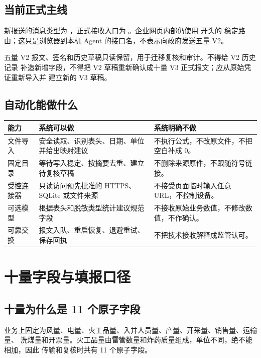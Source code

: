 \documentclass[UTF8,openany,zihao=-4,fontset=none]{ctexbook}
\begin{document}
\section{当前正式主线}

新报送的消息类型为 ，正式接收入口为
。企业网页内部仍使用  开头的
稳定路由；这只是浏览器到本机 Agent 的接口名，不表示向政府发送五量 V2。

五量 V2 报文、签名和历史草稿只读保留，用于迁移复核和审计。不得给 V2 历史记录
补造新增字段，不得把 V2 草稿重新确认成十量 V3 正式报文；应从原始凭证重新导入并
建立新的 V3 草稿。

\section{自动化能做什么}

\begin{longtable}{P{42mm}P{48mm}P{54mm}}
\toprule
\textbf{能力} & \textbf{系统可以做} & \textbf{系统明确不做}\\
\midrule
文件导入 & 安全读取、识别表头、日期、单位并给出映射建议 & 不执行公式，不改原文件，不把空白补成 0。\\
固定目录 & 等待写入稳定、按摘要去重、建立待复核草稿 & 不删除来源原件，不跟随符号链接。\\
受控连接器 & 只读访问预先批准的 HTTPS、SQLite 或文件来源 & 不接受页面临时输入任意 URL，不控制设备。\\
可选模型 & 根据表头和脱敏类型统计建议规范字段 & 不接收原始业务数值，不修改数值，不作确认。\\
可靠交换 & 报文入队、重启恢复、退避重试、保存回执 & 不把技术接收解释成监管认可。\\
\bottomrule
\end{longtable}

\chapter{十量字段与填报口径}

\section{十量为什么是 11 个原子字段}

业务上固定为风量、电量、火工品量、入井人员量、产量、开采量、销售量、运输量、
洗煤量和开票量。火工品量由雷管数量和炸药质量组成，单位不同，绝不能相加，因此
传输和复核时共有 11 个原子字段。
\end{document}
